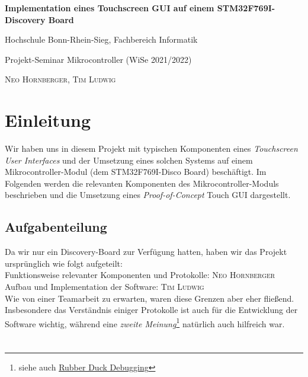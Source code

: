 \documentclass[a4paper,singleside,12pt,titlepage]{scrartcl}
\newcommand{\linkstyle}[1]{\color{blue}#1}
\newcommand{\link}[2]{\href{#1}{\linkstyle{#2}}}
\begin{document}
	    \begin{titlepage}
		
		\hspace*{0pt}
		\vfill
		\begin{center}
			{\Huge\textbf{Implementation eines Touchscreen GUI auf einem STM32F769I-Discovery Board}}\par
			\bigskip
			\bigskip
			{\large Hochschule Bonn-Rhein-Sieg, Fachbereich Informatik}\par
			{\large Projekt-Seminar Mikrocontroller (WiSe 2021/2022)}\par
			\bigskip
			\bigskip
			\bigskip
			\bigskip
			\bigskip
			\textsc{Neo Hornberger, Tim Ludwig}\par
		\end{center}
		\vfill
		\hspace*{0pt}
	\end{titlepage}

	\tableofcontents
	\listoffigures
	\newpage
	
	\section{Einleitung}
		Wir haben uns in diesem Projekt mit typischen Komponenten eines \emph{Touchscreen User Interfaces}
		und der Umsetzung eines solchen Systems auf einem Mikrocontroller-Modul (dem STM32F769I-Disco Board) beschäftigt.
		Im Folgenden werden die relevanten Komponenten des Mikrocontroller-Moduls beschrieben
		und die Umsetzung eines \emph{Proof-of-Concept} Touch GUI dargestellt.
		
		\subsection{Aufgabenteilung}
			Da wir nur ein Discovery-Board zur Verfügung hatten, haben wir das Projekt ursprünglich wie folgt aufgeteilt:\\
			Funktionsweise relevanter Komponenten und Protokolle: \textsc{Neo Hornberger}\\
			Aufbau und Implementation der Software: \textsc{Tim Ludwig}\\
			Wie von einer Teamarbeit zu erwarten, waren diese Grenzen aber eher fließend.
			Insbesondere das Verständnis einiger Protokolle ist auch für die Entwicklung der Software wichtig,
			während eine \emph{zweite Meinung}\footnote{siehe auch \link{https://rubberduckdebugging.com/}{Rubber Duck Debugging}}
			natürlich auch hilfreich war.
	
	\section{}
	
	
	
	
	
	\cite{stm32-base}
	\cite{stm32-ts}
	\cite{ts-holzinger}
	
	\newpage
	\printbibliography[heading=bibnumbered]
\end{document}
